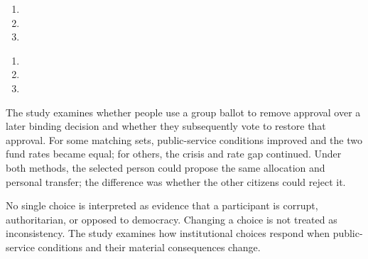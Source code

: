 \begin{enumerate}
  \item {}
  \item {}
  \item {}
\end{enumerate}
\begin{enumerate}[resume]
  \item {}
  \item {}
  \item {}
\end{enumerate}

The study examines whether people use a group ballot to remove approval over a later binding decision and whether they subsequently vote to restore that approval. For some matching sets, public-service conditions improved and the two fund rates became equal; for others, the crisis and rate gap continued. Under both methods, the selected person could propose the same allocation and personal transfer; the difference was whether the other citizens could reject it.

No single choice is interpreted as evidence that a participant is corrupt, authoritarian, or opposed to democracy. Changing a choice is not treated as inconsistency. The study examines how institutional choices respond when public-service conditions and their material consequences change.


